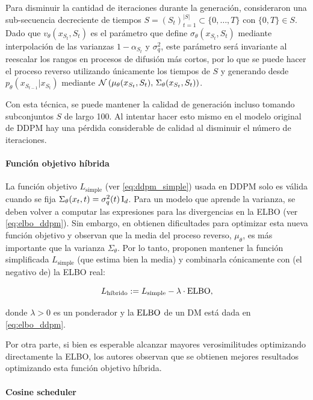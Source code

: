 Para disminuir la cantidad de iteraciones durante la generación, consideraron una sub-secuencia decreciente de tiempos $S=(S_t)_{t=1}^{|S|}\subset\{0,\ldots,T\}$ con $\{0,T\}\in S$. Dado que $v_\theta(x_{S_t},S_t)$ es el parámetro que define $\sigma_\theta(x_{S_t},S_t)$ mediante interpolación de las varianzas $1-\alpha_{S_t}$ y $\sigma_q^2$, este parámetro será invariante al reescalar los rangos en procesos de difusión más cortos, por lo que se puede hacer el proceso reverso utilizando únicamente los tiempos de $S$ y generando desde $p_\theta(x_{S_{t-1}}|x_{S_t})$ mediante $\mathcal{N}\left(\mu_\theta(x_{S_t}, S_t),\,\Sigma_\theta(x_{S_t}, S_t)\right)$.

Con esta técnica, se puede mantener la calidad de generación incluso tomando subconjuntos $S$ de largo 100. Al intentar hacer esto mismo en el modelo original de DDPM hay una pérdida considerable de calidad al disminuir el número de iteraciones.

\paragraph{Función objetivo híbrida}

La función objetivo $L_{\text{simple}}$ (ver \eqref{eq:ddpm_simple}) usada en DDPM solo es válida cuando se fija $\Sigma_\theta(x_t,t) = \sigma_q^2(t)\operatorname{I}_{d}$. Para un modelo que aprende la varianza, se deben volver a computar las expresiones para las divergencias en la ELBO (ver \eqref{eq:elbo_ddpm}). Sin embargo, en \cite{nichol2021improved} obtienen dificultades para optimizar esta nueva función objetivo y observan que la media del proceso reverso, $\mu_\theta$, es más importante que la varianza $\Sigma_\theta$. Por lo tanto, proponen mantener la función simplificada $L_{\text{simple}}$ (que estima bien la media) y combinarla cónicamente con (el negativo de) la ELBO real:

\begin{equation*}
    L_{\text{híbrido}} := L_{\text{simple}} - \lambda\cdot\operatorname{ELBO} ,
\end{equation*}

donde $\lambda>0$ es un ponderador y la $\operatorname{ELBO}$ de un DM está dada en \eqref{eq:elbo_ddpm}.

Por otra parte, si bien es esperable alcanzar mayores verosimilitudes optimizando directamente la ELBO, los autores observan que se obtienen mejores resultados optimizando esta función objetivo híbrida.

\paragraph{Cosine scheduler}

